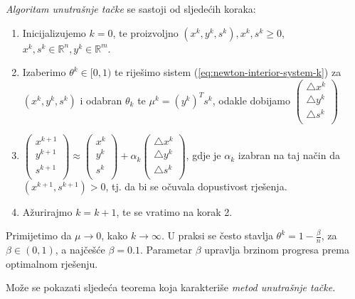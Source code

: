 \documentclass[a4paper, utf8, 11pt, colorlinks]{book}
\begin{document}
\emph{Algoritam unutrašnje tačke} se sastoji od sljedećih koraka:
\begin{enumerate}
	\item Inicijalizujemo $k=0$, te proizvoljno  $(x^k, y^k, s^k), x^k, s^k \geq 0$, $x^k,s^k \in \mathbb{R}^n, y^k \in \mathbb{R}^m$.
	\item Izaberimo $ \theta^k \in [0, 1)$ te riješimo sistem (\ref{eq:newton-interior-system-k}) za $(x^k,y^k,s^k)$ i odabran $\theta_k$ te $\mu^k = (y^k)^T s^k $,  odakle   dobijamo
	$  
	\begin{pmatrix}
		\bigtriangleup x^k      \\
		\bigtriangleup y^k       \\
		\bigtriangleup s^k       \\
	\end{pmatrix}    
	$
	
	\item $ 
	\begin{pmatrix}
		x^{k+1}  \\
		y^{k+1}   \\
		s^{k+1}   \\
	\end{pmatrix} \approx
	\begin{pmatrix}
		x^k  \\
		y^k  \\
		s^k  \\
	\end{pmatrix} +   
	\alpha_k 
	\begin{pmatrix}
		\bigtriangleup x^k       \\
		\bigtriangleup y^k       \\
		\bigtriangleup s^k       \\
	\end{pmatrix}  
	$, gdje je $\alpha_k$ izabran na taj način da $(x^{k+1}, s^{k+1}) > 0$, tj. da bi se očuvala dopustivost rješenja. 
	\item Ažurirajmo $k = k + 1$, te se vratimo na korak 2.
\end{enumerate}
Primijetimo da $\mu \rightarrow 0$, kako $k \rightarrow \infty$. U praksi se često stavlja $\theta^k = 1 - \frac{\beta}{n}$, za $\beta \in (0,1)$, a najčešće $\beta= 0.1$.  Parametar $\beta$ upravlja brzinom progresa prema optimalnom rješenju.  


Može se pokazati sljedeća teorema koja karakteriše \emph{metod unutrašnje tačke}.
\end{document}
